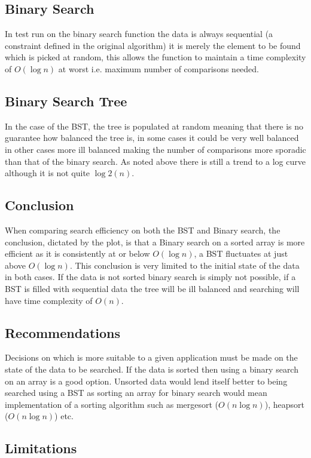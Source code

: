 \documentclass[pdftex,a4paper,10pt,titlepage]{article}
\begin{document}
\subsection{Binary Search}
In test run on the binary search function the data is always sequential (a constraint defined in the original algorithm) it is merely the element to be found which is picked at random, this allows the function to maintain a time complexity of $O(\log{}n)$ at worst i.e. maximum number of comparisons needed. 
\subsection{Binary Search Tree}
In the case of the BST, the tree is populated at random meaning that there is no guarantee how balanced the tree is, in some cases it could be very well balanced in other cases more ill balanced making the number of comparisons more sporadic than that of the binary search. As noted above there is still a trend to a log curve although it is not quite $\log{2}(n)$. 

\subsection{Conclusion}
When comparing search efficiency on both the BST and Binary search, the conclusion, dictated by the plot, is that a Binary search on a sorted array is more efficient as it is consistently at or below $O(\log{}n)$, a BST fluctuates at just above $O(\log{}n)$. This conclusion is very limited to the initial state of the data in both cases. If the data is not sorted binary search is simply not possible, if a BST is filled with sequential data the tree will be ill balanced and searching will have time complexity of $O(n)$. 
\pagebreak
\subsection{Recommendations}
Decisions on which is more suitable to a given application must be made on the state of the data to be searched. If the data is sorted then using a binary search on an array is a good option. Unsorted data would lend itself better to being searched using a BST as sorting an array for binary search would mean implementation of a sorting algorithm such as mergesort ($O(n\log{}n)$), heapsort ($O(n\log{}n)$) etc.

\subsection{Limitations}
\end{document}
